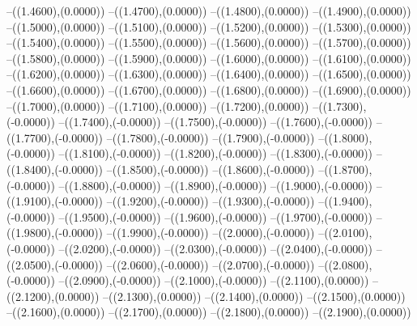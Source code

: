 {	--({\sx*(1.4600)},{\sy*(0.0000)})
	--({\sx*(1.4700)},{\sy*(0.0000)})
	--({\sx*(1.4800)},{\sy*(0.0000)})
	--({\sx*(1.4900)},{\sy*(0.0000)})
	--({\sx*(1.5000)},{\sy*(0.0000)})
	--({\sx*(1.5100)},{\sy*(0.0000)})
	--({\sx*(1.5200)},{\sy*(0.0000)})
	--({\sx*(1.5300)},{\sy*(0.0000)})
	--({\sx*(1.5400)},{\sy*(0.0000)})
	--({\sx*(1.5500)},{\sy*(0.0000)})
	--({\sx*(1.5600)},{\sy*(0.0000)})
	--({\sx*(1.5700)},{\sy*(0.0000)})
	--({\sx*(1.5800)},{\sy*(0.0000)})
	--({\sx*(1.5900)},{\sy*(0.0000)})
	--({\sx*(1.6000)},{\sy*(0.0000)})
	--({\sx*(1.6100)},{\sy*(0.0000)})
	--({\sx*(1.6200)},{\sy*(0.0000)})
	--({\sx*(1.6300)},{\sy*(0.0000)})
	--({\sx*(1.6400)},{\sy*(0.0000)})
	--({\sx*(1.6500)},{\sy*(0.0000)})
	--({\sx*(1.6600)},{\sy*(0.0000)})
	--({\sx*(1.6700)},{\sy*(0.0000)})
	--({\sx*(1.6800)},{\sy*(0.0000)})
	--({\sx*(1.6900)},{\sy*(0.0000)})
	--({\sx*(1.7000)},{\sy*(0.0000)})
	--({\sx*(1.7100)},{\sy*(0.0000)})
	--({\sx*(1.7200)},{\sy*(0.0000)})
	--({\sx*(1.7300)},{\sy*(-0.0000)})
	--({\sx*(1.7400)},{\sy*(-0.0000)})
	--({\sx*(1.7500)},{\sy*(-0.0000)})
	--({\sx*(1.7600)},{\sy*(-0.0000)})
	--({\sx*(1.7700)},{\sy*(-0.0000)})
	--({\sx*(1.7800)},{\sy*(-0.0000)})
	--({\sx*(1.7900)},{\sy*(-0.0000)})
	--({\sx*(1.8000)},{\sy*(-0.0000)})
	--({\sx*(1.8100)},{\sy*(-0.0000)})
	--({\sx*(1.8200)},{\sy*(-0.0000)})
	--({\sx*(1.8300)},{\sy*(-0.0000)})
	--({\sx*(1.8400)},{\sy*(-0.0000)})
	--({\sx*(1.8500)},{\sy*(-0.0000)})
	--({\sx*(1.8600)},{\sy*(-0.0000)})
	--({\sx*(1.8700)},{\sy*(-0.0000)})
	--({\sx*(1.8800)},{\sy*(-0.0000)})
	--({\sx*(1.8900)},{\sy*(-0.0000)})
	--({\sx*(1.9000)},{\sy*(-0.0000)})
	--({\sx*(1.9100)},{\sy*(-0.0000)})
	--({\sx*(1.9200)},{\sy*(-0.0000)})
	--({\sx*(1.9300)},{\sy*(-0.0000)})
	--({\sx*(1.9400)},{\sy*(-0.0000)})
	--({\sx*(1.9500)},{\sy*(-0.0000)})
	--({\sx*(1.9600)},{\sy*(-0.0000)})
	--({\sx*(1.9700)},{\sy*(-0.0000)})
	--({\sx*(1.9800)},{\sy*(-0.0000)})
	--({\sx*(1.9900)},{\sy*(-0.0000)})
	--({\sx*(2.0000)},{\sy*(-0.0000)})
	--({\sx*(2.0100)},{\sy*(-0.0000)})
	--({\sx*(2.0200)},{\sy*(-0.0000)})
	--({\sx*(2.0300)},{\sy*(-0.0000)})
	--({\sx*(2.0400)},{\sy*(-0.0000)})
	--({\sx*(2.0500)},{\sy*(-0.0000)})
	--({\sx*(2.0600)},{\sy*(-0.0000)})
	--({\sx*(2.0700)},{\sy*(-0.0000)})
	--({\sx*(2.0800)},{\sy*(-0.0000)})
	--({\sx*(2.0900)},{\sy*(-0.0000)})
	--({\sx*(2.1000)},{\sy*(-0.0000)})
	--({\sx*(2.1100)},{\sy*(0.0000)})
	--({\sx*(2.1200)},{\sy*(0.0000)})
	--({\sx*(2.1300)},{\sy*(0.0000)})
	--({\sx*(2.1400)},{\sy*(0.0000)})
	--({\sx*(2.1500)},{\sy*(0.0000)})
	--({\sx*(2.1600)},{\sy*(0.0000)})
	--({\sx*(2.1700)},{\sy*(0.0000)})
	--({\sx*(2.1800)},{\sy*(0.0000)})
	--({\sx*(2.1900)},{\sy*(0.0000)})
}
